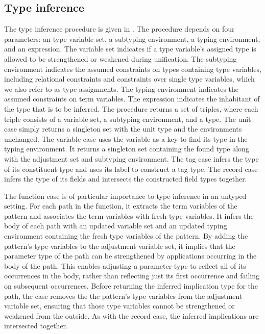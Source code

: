 \documentclass[acmsmall]{acmart}
\theoremstyle{definition}
\begin{document}
\subsection{Type inference}
The type inference procedure is given in .
The procedure depends on four parameters: an type variable set, a subtyping environment, 
a typing environment, and an expression.
The variable set indicates if a type variable's assigned type is allowed to be strengthened or weakened  
during unification.
The subtyping environment indicates the assumed constraints on types containing type variables,
including relational constraints and constraints over single type variables, 
which we also refer to as type assignments.
The typing environment indicates the assumed constraints on term variables.
The expression indicates the inhabitant of the type that is to be inferred.
The procedure returns a set of triples, where each triple consists of a variable set, a subtyping environment,
and a type.
The unit case simply returns a singleton set with the unit type and the environments unchanged. 
The variable case uses the variable as a key to find its type in the typing environment. 
It returns a singleton set containing the found type along with the adjustment set and subtyping environment.
The tag case infers the type of its constituent type and uses its label to construct a tag type.
The record case infers the type of its fields and intersects the constructed field types together.

The function case is of particular importance to type inference in an untyped setting.
For each path in the function, it extracts the term variables of the pattern and associates 
the term variables with fresh type variables. It infers the body of each path 
with an updated variable set and an updated typing environment containing the fresh
type variables of the pattern. By adding the pattern's type variables to the adjustment variable set,
it implies that the parameter type of the path can be strengthened by applications
occurring in the body of the path. This enables adjusting a parameter type to reflect all of its 
occurrences in the body, 
rather than reflecting just its first occurrence and failing on subsequent occurrences. 
Before returning the inferred implication type for the path, the case removes
the the pattern's type variables from the adjustment variable set, ensuring
that those type variables cannot be strengthened or weakened from the outside. 
As with the record case, the inferred implications are intersected together.
\end{document}
